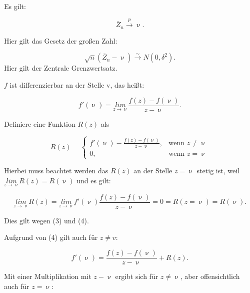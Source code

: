 \documentclass[10pt]{article}
\newcommand{\KW}{\overset{p} \longrightarrow} %
\newcommand{\KV}{\overset{\sim} \longrightarrow} %
\newcommand{\eqname}[1]{\tag*{#1}}%
\newenvironment{BWS}[1][]
{\begin{Beweis}[frametitle=#1]}{\end{Beweis}}
\begin{document}
	
	\begin{BWS}[Beweis 1.3.1 Delta-Methode]
		Es gilt:
		
		
		\begin{equation*}
			\bar{Z}_n \KW \upnu  \eqname{(1)}.
		\end{equation*}
		
		\noindent Hier gilt das Gesetz der großen Zahl:
		
		\begin{equation*}
			\sqrt{n} (\bar{Z}_n - \upnu) \KV N(0,\delta^2) \eqname{(2)}.
		\end{equation*}
		Hier gilt der Zentrale Grenzwertsatz.
		
		$f$ ist differenzierbar an der Stelle v, das heißt: 
		
		\begin{equation*}
			f'(\upnu) = \underset{z \rightarrow \upnu}{lim} \frac{f(z) - f(\upnu)}{z-\upnu} \eqname{(3)}.
		\end{equation*}
		
		\noindent Definiere eine Funktion $R(z)$ als
		
		\begin{equation*}
			R(z) = \begin{cases} 
				f'(\upnu) - \frac{f(z)- f(\upnu)}{z-\upnu}, &\text{wenn } z \neq \upnu\\
				0, &\text{wenn } z = \upnu
			\end{cases} \eqname{(4)}
		\end{equation*}
		
		\noindent Hierbei muss beachtet werden das $R(z)$ an der Stelle $z=\upnu$ stetig ist, weil $\underset{z \rightarrow \upnu} {lim} R(z) = R(\upnu)$ und es gilt:
		
		\begin{equation*}
			\underset{z \rightarrow \upnu} {lim} R(z) = \underset{z \rightarrow \upnu}{lim} f'(\upnu) \frac{f(z)-f(\upnu)}{z-\upnu} = 0 = R(z = \upnu) = R(\upnu).
		\end{equation*}
		
		\noindent Dies gilt wegen (3) und (4).
		
		\noindent Aufgrund von (4) gilt auch für $z \neq v$:
		
		\begin{equation*}
			f'(\upnu)=\frac{f(z) - f(\upnu)}{z - \upnu} + R(z).
		\end{equation*}
		
		Mit einer Multiplikation mit $z-\upnu$ ergibt sich für $z \neq \upnu$, aber offensichtlich auch für $z = \upnu$:
		

\end{BWS}
\end{document}
